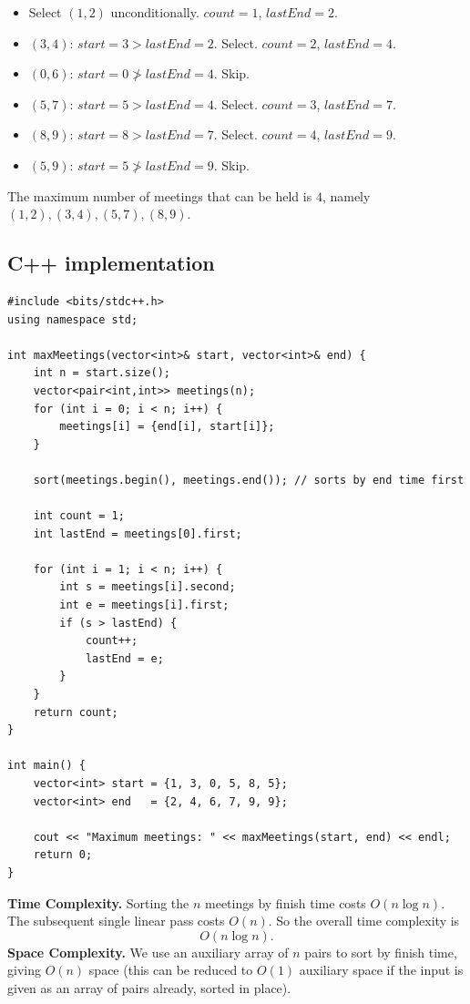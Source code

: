 \begin{itemize}
  \item Select $(1,2)$ unconditionally. $\textit{count}=1$,
        $\textit{lastEnd}=2$.
  \item $(3,4)$: $\textit{start}=3 > \textit{lastEnd}=2$. Select.
        $\textit{count}=2$, $\textit{lastEnd}=4$.
  \item $(0,6)$: $\textit{start}=0 \not> \textit{lastEnd}=4$. Skip.
  \item $(5,7)$: $\textit{start}=5 > \textit{lastEnd}=4$. Select.
        $\textit{count}=3$, $\textit{lastEnd}=7$.
  \item $(8,9)$: $\textit{start}=8 > \textit{lastEnd}=7$. Select.
        $\textit{count}=4$, $\textit{lastEnd}=9$.
  \item $(5,9)$: $\textit{start}=5 \not> \textit{lastEnd}=9$. Skip.
\end{itemize}

The maximum number of meetings that can be held is $\boxed{4}$, namely
$(1,2), (3,4), (5,7), (8,9)$.

\subsection*{C++ implementation}

\begin{lstlisting}
#include <bits/stdc++.h>
using namespace std;

int maxMeetings(vector<int>& start, vector<int>& end) {
    int n = start.size();
    vector<pair<int,int>> meetings(n);
    for (int i = 0; i < n; i++) {
        meetings[i] = {end[i], start[i]};
    }

    sort(meetings.begin(), meetings.end()); // sorts by end time first

    int count = 1;
    int lastEnd = meetings[0].first;

    for (int i = 1; i < n; i++) {
        int s = meetings[i].second;
        int e = meetings[i].first;
        if (s > lastEnd) {
            count++;
            lastEnd = e;
        }
    }
    return count;
}

int main() {
    vector<int> start = {1, 3, 0, 5, 8, 5};
    vector<int> end   = {2, 4, 6, 7, 9, 9};

    cout << "Maximum meetings: " << maxMeetings(start, end) << endl;
    return 0;
}
\end{lstlisting}

\begin{complexitybox}
\textbf{Time Complexity.} Sorting the $n$ meetings by finish time costs
$O(n \log n)$. The subsequent single linear pass costs $O(n)$. So the
overall time complexity is
\[
  O(n \log n).
\]
\textbf{Space Complexity.} We use an auxiliary array of $n$ pairs to sort
by finish time, giving $O(n)$ space (this can be reduced to $O(1)$
auxiliary space if the input is given as an array of pairs already, sorted
in place).
\end{complexitybox}

